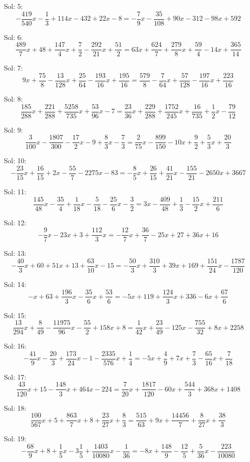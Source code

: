 Sol: 5:\[-\frac{419}{540}x - \frac{1}{3}+114x - 432+22x - 8=-\frac{7}{9}x - \frac{35}{108}+90x - 312-98x + 592\]


Sol: 6:\[\frac{489}{7}x + 48+\frac{147}{4}x + \frac{7}{2}-\frac{292}{21}x + \frac{51}{2}=63x + \frac{624}{7}+\frac{279}{8}x + \frac{59}{4}-14x + \frac{365}{14}\]


Sol: 7:\[9x + \frac{75}{8}-\frac{13}{128}x + \frac{25}{64}-\frac{193}{16}x + \frac{195}{16}=\frac{579}{8}-\frac{7}{64}x + \frac{57}{128}-\frac{197}{16}x + \frac{223}{16}\]


Sol: 8:\[\frac{185}{288}x + \frac{221}{288}+\frac{5258}{735}x+\frac{53}{96}x - 7=\frac{23}{36}x + \frac{229}{288}+\frac{1752}{245}x + \frac{16}{735}+\frac{1}{2}x - \frac{79}{12}\]


Sol: 9:\[\frac{3}{100}x - \frac{1807}{300}-\frac{17}{2}x - 9+\frac{8}{3}x - \frac{7}{3}=\frac{2}{75}x - \frac{899}{150}-10x + \frac{9}{2}+\frac{5}{3}x + \frac{20}{3}\]


Sol: 10:\[-\frac{23}{15}x + \frac{16}{15}+2x - \frac{55}{7}-2275x - 83=-\frac{8}{5}x + \frac{26}{15}+\frac{41}{21}x - \frac{155}{21}-2650x + 3667\]


Sol: 11:\[\frac{145}{48}x - \frac{35}{4}+\frac{1}{18}x - \frac{5}{18}-\frac{25}{6}x - \frac{3}{2}=3x - \frac{409}{48}+\frac{1}{3}-\frac{15}{2}x + \frac{211}{6}\]


Sol: 12:\[-\frac{9}{7}x-23x + 3+\frac{112}{3}x=-\frac{12}{7}x + \frac{36}{7}-25x + 27+36x + 16\]


Sol: 13:\[-\frac{40}{3}x + 60+51x + 13+\frac{63}{10}x - 15=-\frac{50}{3}x + \frac{310}{3}+39x + 169+\frac{151}{24}x - \frac{1787}{120}\]


Sol: 14:\[-x + 63+\frac{196}{3}x-\frac{35}{6}x + \frac{53}{6}=-5x + 119+\frac{124}{3}x + 336-6x + \frac{67}{6}\]


Sol: 15:\[\frac{13}{294}x + \frac{8}{49}-\frac{11975}{96}x - \frac{55}{2}+158x + 8=\frac{1}{42}x + \frac{23}{49}-125x - \frac{755}{32}+8x + 2258\]


Sol: 16:\[-\frac{41}{9}x - \frac{20}{3}+\frac{173}{24}x - 1-\frac{2335}{576}x + \frac{1}{4}=-5x + \frac{4}{9}+7x + \frac{7}{3}-\frac{65}{16}x + \frac{7}{18}\]


Sol: 17:\[\frac{43}{120}x + 15-\frac{148}{3}x+464x - 224=\frac{7}{20}x + \frac{1817}{120}-60x + \frac{544}{3}+368x + 1408\]


Sol: 18:\[\frac{100}{567}x + 5+\frac{863}{7}x + 8+\frac{23}{27}x + \frac{8}{3}=\frac{515}{63}+9x + \frac{14456}{7}+\frac{8}{27}x + \frac{38}{3}\]


Sol: 19:\[-\frac{68}{9}x + 8+\frac{1}{5}x - 3\frac{1}{5}+\frac{1403}{10080}x - \frac{1}{36}=-8x + \frac{148}{9}-\frac{12}{5}+\frac{5}{36}x - \frac{223}{10080}\]


